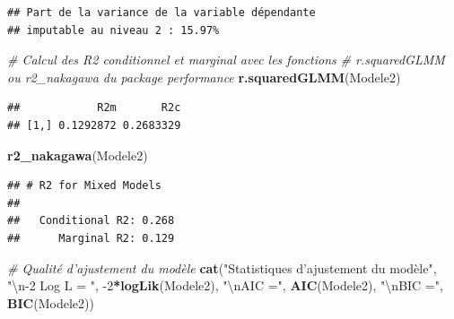 \documentclass[
  11pt,
  french,
]{book}
\makeatletter
\newenvironment{Shaded}{\begin{snugshade}}{\end{snugshade}}
\newcommand{\CharTok}[1]{\textcolor[rgb]{0.31,0.60,0.02}{#1}}
\newcommand{\CommentTok}[1]{\textcolor[rgb]{0.56,0.35,0.01}{\textit{#1}}}
\newcommand{\DataTypeTok}[1]{\textcolor[rgb]{0.13,0.29,0.53}{#1}}
\newcommand{\DecValTok}[1]{\textcolor[rgb]{0.00,0.00,0.81}{#1}}
\newcommand{\KeywordTok}[1]{\textcolor[rgb]{0.13,0.29,0.53}{\textbf{#1}}}
\newcommand{\NormalTok}[1]{#1}
\newcommand{\OperatorTok}[1]{\textcolor[rgb]{0.81,0.36,0.00}{\textbf{#1}}}
\newcommand{\StringTok}[1]{\textcolor[rgb]{0.31,0.60,0.02}{#1}}
\newenvironment{kframe}{%
\medskip{}
\setlength{\fboxsep}{.8em}
 \def\at@end@of@kframe{}%
 \ifinner\ifhmode%
  \def\at@end@of@kframe{\end{minipage}}%
  \begin{minipage}{\columnwidth}%
 \fi\fi%
 \def\FrameCommand##1{\hskip\@totalleftmargin \hskip-\fboxsep
 \colorbox{shadecolor}{##1}\hskip-\fboxsep
     \hskip-\linewidth \hskip-\@totalleftmargin \hskip\columnwidth}%
 \MakeFramed {\advance\hsize-\width
   \@totalleftmargin\z@ \linewidth\hsize
   \@setminipage}}%
 {\par\unskip\endMakeFramed%
 \at@end@of@kframe}
\renewenvironment{Shaded}{\begin{kframe}}{\end{kframe}}
\makeatother
\begin{document}
\begin{Shaded}
\end{Shaded}

\begin{verbatim}
## Part de la variance de la variable dépendante 
## imputable au niveau 2 : 15.97%
\end{verbatim}

\begin{Shaded}
\begin{Highlighting}[]
\CommentTok{# Calcul des R2 conditionnel et marginal avec les fonctions}
\CommentTok{# r.squaredGLMM ou r2_nakagawa du package performance}
\KeywordTok{r.squaredGLMM}\NormalTok{(Modele2)}
\end{Highlighting}
\end{Shaded}

\begin{verbatim}
##            R2m       R2c
## [1,] 0.1292872 0.2683329
\end{verbatim}

\begin{Shaded}
\begin{Highlighting}[]
\KeywordTok{r2_nakagawa}\NormalTok{(Modele2)}
\end{Highlighting}
\end{Shaded}

\begin{verbatim}
## # R2 for Mixed Models
## 
##   Conditional R2: 0.268
##      Marginal R2: 0.129
\end{verbatim}

\begin{Shaded}
\begin{Highlighting}[]
\CommentTok{# Qualité d'ajustement du modèle}
\KeywordTok{cat}\NormalTok{(}\StringTok{"Statistiques d'ajustement du modèle"}\NormalTok{,}
    \StringTok{"}\CharTok{\textbackslash{}n}\StringTok{-2 Log L = "}\NormalTok{, }\DecValTok{-2}\OperatorTok{*}\KeywordTok{logLik}\NormalTok{(Modele2),}
    \StringTok{"}\CharTok{\textbackslash{}n}\StringTok{AIC ="}\NormalTok{, }\KeywordTok{AIC}\NormalTok{(Modele2), }
    \StringTok{"}\CharTok{\textbackslash{}n}\StringTok{BIC ="}\NormalTok{, }\KeywordTok{BIC}\NormalTok{(Modele2))}
\end{Highlighting}
\end{Shaded}
\end{document}
